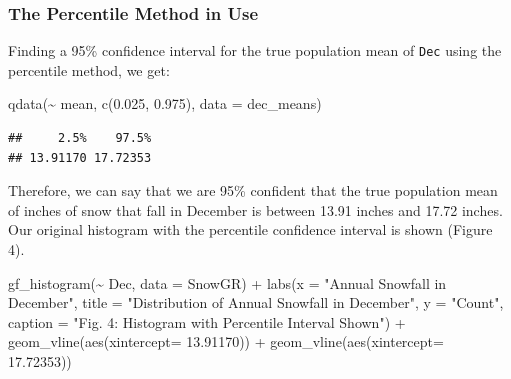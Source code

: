 \documentclass[12pt]{article}
\newenvironment{Shaded}{\begin{snugshade}}{\end{snugshade}}
\newcommand{\AttributeTok}[1]{\textcolor[rgb]{0.77,0.63,0.00}{#1}}
\newcommand{\FloatTok}[1]{\textcolor[rgb]{0.00,0.00,0.81}{#1}}
\newcommand{\FunctionTok}[1]{\textcolor[rgb]{0.00,0.00,0.00}{#1}}
\newcommand{\NormalTok}[1]{#1}
\newcommand{\SpecialCharTok}[1]{\textcolor[rgb]{0.00,0.00,0.00}{#1}}
\newcommand{\StringTok}[1]{\textcolor[rgb]{0.31,0.60,0.02}{#1}}
\begin{document}
\hypertarget{the-percentile-method-in-use}{%
\subsubsection{The Percentile Method in
Use}\label{the-percentile-method-in-use}}

Finding a 95\% confidence interval for the true population mean of
\texttt{Dec} using the percentile method, we get:

\begin{Shaded}
\begin{Highlighting}[]
\FunctionTok{qdata}\NormalTok{(}\SpecialCharTok{\textasciitilde{}}\NormalTok{ mean, }\FunctionTok{c}\NormalTok{(}\FloatTok{0.025}\NormalTok{, }\FloatTok{0.975}\NormalTok{), }\AttributeTok{data =}\NormalTok{ dec\_means)}
\end{Highlighting}
\end{Shaded}

\begin{verbatim}
##     2.5%    97.5% 
## 13.91170 17.72353
\end{verbatim}

Therefore, we can say that we are 95\% confident that the true
population mean of inches of snow that fall in December is between 13.91
inches and 17.72 inches. Our original histogram with the percentile
confidence interval is shown (Figure 4).

\begin{Shaded}
\begin{Highlighting}[]
\FunctionTok{gf\_histogram}\NormalTok{(}\SpecialCharTok{\textasciitilde{}}\NormalTok{ Dec, }\AttributeTok{data =}\NormalTok{ SnowGR) }\SpecialCharTok{+}
  \FunctionTok{labs}\NormalTok{(}\AttributeTok{x =} \StringTok{"Annual Snowfall in December"}\NormalTok{, }
       \AttributeTok{title =} \StringTok{"Distribution of Annual Snowfall in December"}\NormalTok{, }\AttributeTok{y =} \StringTok{"Count"}\NormalTok{,}
       \AttributeTok{caption =} \StringTok{"Fig. 4: Histogram with Percentile Interval Shown"}\NormalTok{) }\SpecialCharTok{+}
  \FunctionTok{geom\_vline}\NormalTok{(}\FunctionTok{aes}\NormalTok{(}\AttributeTok{xintercept=} \FloatTok{13.91170}\NormalTok{)) }\SpecialCharTok{+}
  \FunctionTok{geom\_vline}\NormalTok{(}\FunctionTok{aes}\NormalTok{(}\AttributeTok{xintercept=} \FloatTok{17.72353}\NormalTok{))}
\end{Highlighting}
\end{Shaded}
\end{document}

